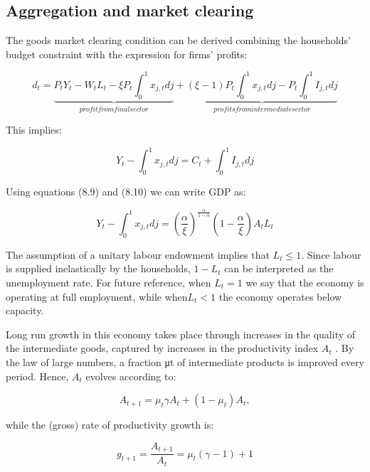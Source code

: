 \documentclass[10pt,math=newtx,citestyle=gb7714-2015,bibstyle=gb7714-2015]{elegantbook}
\begin{document}
{{{\subsection{Aggregation and market clearing}

The goods market clearing condition can be derived combining the households’ budget constraint with the
expression for firms’ profits:

\begin{equation}
	d_t = \underbrace{P_t Y_t-W_t L_t -\xi P_t \int_0^1 x_{j,t}dj}_{profit from final sector}+\underbrace{(\xi -1 )P_t \int_0^1 x_{j,t}dj-P_t \int_0^1I_{j,t}dj}_{profits from intermediate sector}
\end{equation}

This implies:

\begin{equation}
	Y_t - \int_0^1 x_{j,t}dj = C_t +\int_0^1I_{j,t}dj
\end{equation}
	
	Using equations (8.9) and (8.10) we can write GDP as:
	
	\begin{equation}
		Y_t - \int_0^1 x_{j,t}dj = \left(\frac{\alpha}{\xi}\right)^{\frac{\alpha}{1-\alpha}}\left(1-\frac{\alpha}{\xi}\right)A_tL_t
	\end{equation}
	
	The assumption of a unitary labour endowment implies that $L_t \le 1$. Since labour is supplied inelastically by the households, $1−L_t$ can be interpreted as the unemployment rate. For future reference, when $L_t =1 $ we say that the economy is operating at full employment, while when$L_t <1$ the economy operates below capacity.
	
    Long run growth in this economy takes place through increases in the quality of the intermediate goods, captured by increases in the productivity index $A_t$ . By the law of large numbers, a fraction μt of intermediate products is improved every period. Hence, $A_t$ evolves according to:

\begin{equation}
A_{t+1}=\mu_t \gamma A_t+(1-\mu_t )A_t ,
\end{equation}

while the (gross) rate of productivity growth is:

\begin{equation}
	g_{t+1}= \frac{A_{t+1}}{A_t}=\mu_t(\gamma -1 ) +1
\end{equation}

}}}
\end{document}
